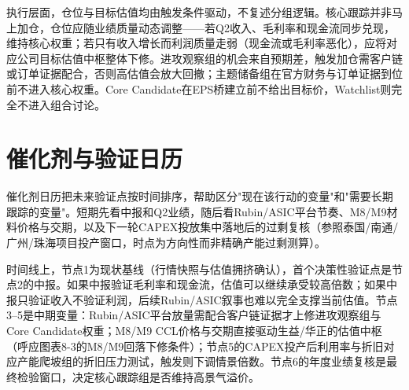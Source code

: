 执行层面，仓位与目标估值均由触发条件驱动，不复述分组逻辑。核心跟踪并非马上加仓，仓位应随业绩质量动态调整——若Q2收入、毛利率和现金流同步兑现，维持核心权重；若只有收入增长而利润质量走弱（现金流或毛利率恶化），应将对应公司目标估值中枢整体下修。进攻观察组的机会来自预期差，触发加仓需客户链或订单证据配合，否则高估值会放大回撤；主题储备组在官方财务与订单证据到位前不进入核心权重。Core Candidate在EPS桥建立前不给出目标价，Watchlist则完全不进入组合讨论。

\section{催化剂与验证日历}

催化剂日历把未来验证点按时间排序，帮助区分"现在该行动的变量"和"需要长期跟踪的变量"。短期先看中报和Q2业绩，随后看Rubin/ASIC平台节奏、M8/M9材料价格与交期，以及下一轮CAPEX投放集中落地后的过剩复核（参照泰国/南通/广州/珠海项目投产窗口，时点为方向性而非精确产能过剩测算）。

\begin{exhibitbox}[图表10-2：催化剂与验证日历]
\centering
{}
\end{exhibitbox}

时间线上，节点1为现状基线（行情快照与估值拥挤确认），首个决策性验证点是节点2的中报。如果中报验证毛利率和现金流，估值可以继续承受较高倍数；如果中报只验证收入不验证利润，后续Rubin/ASIC叙事也难以完全支撑当前估值。节点3--5是中期变量：Rubin/ASIC平台放量需配合客户链证据才上修进攻观察组与Core Candidate权重；M8/M9 CCL价格与交期直接驱动生益/华正的估值中枢（呼应图表8-3的M8/M9回落下修条件）；节点5的CAPEX投产后利用率与折旧对应产能爬坡组的折旧压力测试，触发则下调情景倍数。节点6的年度业绩复核是最终检验窗口，决定核心跟踪组是否维持高景气溢价。

